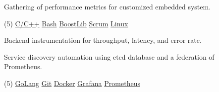 \documentclass[10pt,a4paper]{altacv}
\begin{document}
{\smallskip\justifying
{\faAngleRight} {\color{description}Gathering of performance metrics for customized embedded system.}
\par}


\vspace{-0.5mm}
\begin{tasks}[label-offset=0.5mm, item-indent=5.0mm, label-align=left, label={\scriptsize\faCode}, label-format={\scriptsize\color{tech}}, item-format={\bfseries\footnotesize\color{emphasis}}](5)
	\task \href{https://www.cplusplus.com/}{C/C++}
	\task \href{https://www.gnu.org/software/bash/}{Bash}
	\task \href{https://www.boost.org/}{BoostLib}
	\task \href{http://www.scrummanifesto.org/}{Scrum}
	\task \href{https://www.archlinux.org/}{Linux}
\end{tasks}

\divider


{\smallskip\justifying
{\faAngleRight} {\color{description}Backend instrumentation for throughput, latency, and error rate.}
\par}
\smallskip

{\smallskip\justifying
{\faAngleRight} {\color{description}Service discovery automation using etcd database and a federation of Prometheus.}
\par}

\vspace{-0.5mm}
\begin{tasks}[label-offset=0.5mm, item-indent=5.0mm, label-align=left, label={\scriptsize\faCode}, label-format={\scriptsize\color{tech}}, item-format={\bfseries\footnotesize\color{emphasis}}](5)
	\task \href{https://golang.org/}{GoLang}
	\task \href{https://git-scm.com/}{Git}
	\task \href{https://www.docker.com/}{Docker}
	\task \href{https://grafana.com/}{Grafana}
	\task \href{https://prometheus.io/}{Prometheus}
\end{tasks}

\divider


\end{document}
